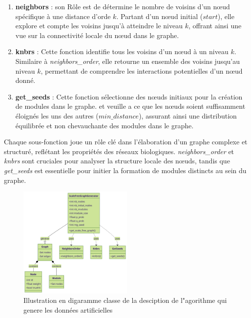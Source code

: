 \begin{enumerate}
    \item \textbf{neighbors} :
    son Rôle est de  détermine le nombre de voisins d'un nœud spécifique à une distance d'orde \(k\).  Partant d'un nœud initial (\(start\)), elle explore et compte les voisins jusqu'à atteindre le niveau \(k\), offrant ainsi une vue sur la connectivité locale du nœud dans le graphe.

    \item \textbf{knbrs} :
     Cette fonction identifie tous les voisins d'un nœud à un niveau \(k\).
     Similaire à \textit{neighbors\_order}, elle retourne un ensemble des voisins jusqu'au niveau \(k\), permettant de comprendre les interactions potentielles d'un nœud donné.

    \item \textbf{get\_seeds} : Cette fonction sélectionne des nœuds initiaux pour la création de modules dans le graphe. et veuille a ce que les  nœuds  soient suffisamment éloignés les uns des autres (\(min\_distance\)), assurant ainsi une distribution équilibrée et non chevauchante des modules dans le graphe.
  
\end{enumerate}

Chaque sous-fonction joue un rôle clé dans l'élaboration d'un graphe complexe et structuré, reflétant les propriétés des réseaux biologiques. \textit{neighbors\_order} et \textit{knbrs} sont cruciales pour analyser la structure locale des nœuds, tandis que \textit{get\_seeds} est essentielle pour initier la formation de modules distincts au sein du graphe.

\begin{figure}[h]
\centering
\includegraphics[width=0.50\textwidth]{Pictures/classe_diagramDonnee.png}
\captionsetup{justification=centering}
\caption{Illustration en digaramme classe de la desciption de l"agorithme qui genere les données artificielles }
\label{fig:classe_Diagramme}
\end{figure}

